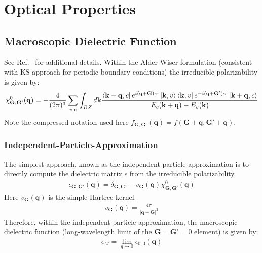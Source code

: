 \def\bq{\mathbf{q}}
\def\bG{\mathbf{G}}
\def\bk{\mathbf{k}}

\chapter{Optical Properties}

\section{Macroscopic Dielectric Function}
See Ref.~\cite{adler1962quantum,wiser1963dielectric,baroni1986ab} for additional details.
Within the Alder-Wiser formulation (consistent with KS approach for periodic boundary conditions) the irreducible polarizability is given by:
\begin{align}
    \chi^{0}_{\bG,\bG'}(\bq)=-\frac{4}{(2\pi)^3}\sum_{v,c}\int_{BZ}d\bk
    \frac{
    \bra{\bk+\bq,c}e^{i(\bq+\bG)\cdot r}\ket{\bk,v}
    \bra{\bk,v}e^{-i(\bq+\bG')\cdot r}\ket{\bk+\bq,c}
    }{E_c(\bk+\bq)-E_v(\bk)}
\end{align}
Note the compressed notation used here $f_{\bG,\bG'}(\bq)=f(\bG+\bq,\bG'+\bq)$.

\subsection{Independent-Particle-Approximation}
The simplest approach, known as the independent-particle approximation is to directly compute the dielectric matrix $\epsilon$ from the irreducible polarizability.
\begin{align}
    \epsilon_{\bG,\bG'}(\bq)=
    \delta_{\bG,\bG'}-v_\bG(\bq)\chi^{0}_{\bG,\bG'}(\bq)
    \label{app:eq:dielectric}
\end{align}
Here $v_\bG(\bq)$ is the simple Hartree kernel.
\begin{align}
    v_\bG(\bq)=\frac{4\pi}{|\bq+\bG|^2}
\end{align}
Therefore, within the independent-particle approximation, the macroscopic dielectric function (long-wavelength limit of the $\bG=\bG'=0$ element) is given by:
\begin{align}
    \epsilon_{M}=\lim_{q\rightarrow 0} \epsilon_{0,0}(\bq)
\end{align}

